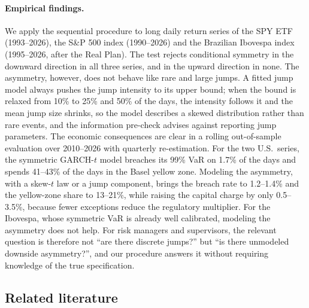 \documentclass[11pt,a4paper]{article}
\theoremstyle{definition}
\theoremstyle{remark}
\begin{document}
\paragraph{Empirical findings.} We apply the sequential procedure to long daily return series of the SPY ETF (1993--2026), the S\&P 500 index (1990--2026) and the Brazilian Ibovespa index (1995--2026, after the Real Plan). The test rejects conditional symmetry in the downward direction in all three series, and in the upward direction in none. The asymmetry, however, does not behave like rare and large jumps. A fitted jump model always pushes the jump intensity to its upper bound; when the bound is relaxed from 10\% to 25\% and 50\% of the days, the intensity follows it and the mean jump size shrinks, so the model describes a skewed distribution rather than rare events, and the information pre-check advises against reporting jump parameters. The economic consequences are clear in a rolling out-of-sample evaluation over 2010--2026 with quarterly re-estimation. For the two U.S.\ series, the symmetric GARCH-$t$ model breaches its 99\% VaR on 1.7\% of the days and spends 41--43\% of the days in the Basel yellow zone. Modeling the asymmetry, with a skew-$t$ law or a jump component, brings the breach rate to 1.2--1.4\% and the yellow-zone share to 13--21\%, while raising the capital charge by only 0.5--3.5\%, because fewer exceptions reduce the regulatory multiplier. For the Ibovespa, whose symmetric VaR is already well calibrated, modeling the asymmetry does not help. For risk managers and supervisors, the relevant question is therefore not ``are there discrete jumps?'' but ``is there unmodeled downside asymmetry?'', and our procedure answers it without requiring knowledge of the true specification.

\subsection{Related literature}\label{sec:lit}
\end{document}
